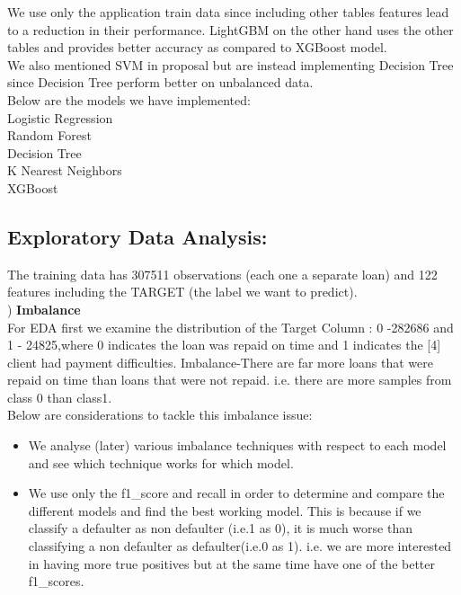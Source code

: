 \documentclass[fleqn,10pt]{SelfArx} %
\begin{document}


We use only the application train data since including other tables features lead to a reduction in their performance. LightGBM on the other hand uses the other tables and provides better accuracy as compared to XGBoost model. \\

\noindent
We also mentioned SVM in proposal but are instead implementing Decision Tree since Decision Tree perform  better on unbalanced data.\\


\noindent
Below are the models we have implemented:\\
Logistic Regression\\
Random Forest\\
Decision Tree\\
K Nearest Neighbors\\
XGBoost\\

\subsection{Exploratory Data Analysis:}

The training data has 307511 observations (each one a separate loan) and 122 features including the TARGET (the label we want to predict). \\

)	\textbf{Imbalance}\\
For EDA first we examine the distribution of the Target Column : 0 -282686 and 1 - 24825,where 0 indicates the loan was repaid on time and 1 indicates the [4]
client had payment difficulties. Imbalance-There are far more loans that were repaid on time than loans that were not repaid. i.e. there are more samples from class 0 than class1. 
 \\
Below are considerations to tackle this imbalance issue:\\
\begin{itemize}
	\item We analyse (later) various imbalance techniques with respect to each model and see which technique works for which model.
	\item We use only the f1_score and recall in order to determine and compare the different models and find the best working model. This is because if we classify a defaulter as non defaulter (i.e.1 as 0), it is much worse than classifying a non defaulter as defaulter(i.e.0 as 1). i.e. we are more interested in having more true positives but at the same time have one of the better f1_scores.  
\end{itemize}
\end{document}
